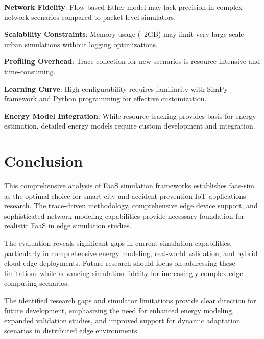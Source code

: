 \textbf{Network Fidelity}: Flow-based Ether model may lack precision in complex network scenarios compared to packet-level simulators.

\textbf{Scalability Constraints}: Memory usage (~2GB) may limit very large-scale urban simulations without logging optimizations.

\textbf{Profiling Overhead}: Trace collection for new scenarios is resource-intensive and time-consuming.

\textbf{Learning Curve}: High configurability requires familiarity with SimPy framework and Python programming for effective customization.

\textbf{Energy Model Integration}: While resource tracking provides basis for energy estimation, detailed energy models require custom development and integration.
\section{Conclusion}

This comprehensive analysis of FaaS simulation frameworks establishes faas-sim as the optimal choice for smart city and accident prevention IoT applications research. The trace-driven methodology, comprehensive edge device support, and sophisticated network modeling capabilities provide necessary foundation for realistic FaaS in edge simulation studies.

The evaluation reveals significant gaps in current simulation capabilities, particularly in comprehensive energy modeling, real-world validation, and hybrid cloud-edge deployments. Future research should focus on addressing these limitations while advancing simulation fidelity for increasingly complex edge computing scenarios.

The identified research gaps and simulator limitations provide clear direction for future development, emphasizing the need for enhanced energy modeling, expanded validation studies, and improved support for dynamic adaptation scenarios in distributed edge environments.